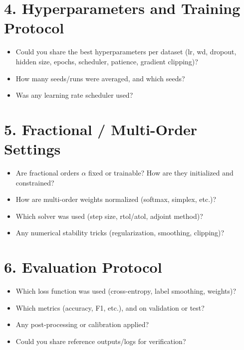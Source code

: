 \documentclass[11pt,a4paper]{article}
\begin{document}
	\section*{4. Hyperparameters and Training Protocol}
	\begin{itemize}[leftmargin=1.5cm]
		\item Could you share the best hyperparameters per dataset (lr, wd, dropout, hidden size, epochs, scheduler, patience, gradient clipping)?
		\item How many seeds/runs were averaged, and which seeds?
		\item Was any learning rate scheduler used?
	\end{itemize}
	
	\section*{5. Fractional / Multi-Order Settings}
	\begin{itemize}[leftmargin=1.5cm]
		\item Are fractional orders $\alpha$ fixed or trainable? How are they initialized and constrained?
		\item How are multi-order weights normalized (softmax, simplex, etc.)?
		\item Which solver was used (step size, rtol/atol, adjoint method)?
		\item Any numerical stability tricks (regularization, smoothing, clipping)?
	\end{itemize}
	
	\section*{6. Evaluation Protocol}
	\begin{itemize}[leftmargin=1.5cm]
		\item Which loss function was used (cross-entropy, label smoothing, weights)?
		\item Which metrics (accuracy, F1, etc.), and on validation or test?
		\item Any post-processing or calibration applied?
		\item Could you share reference outputs/logs for verification?
	\end{itemize}
	
\end{document}
